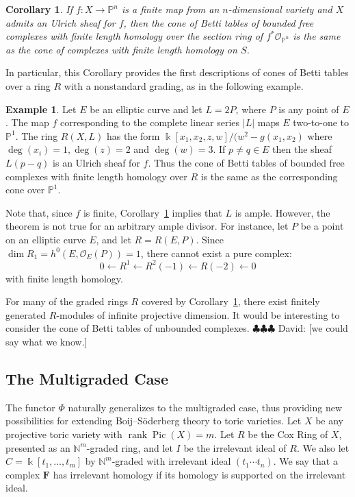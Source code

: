 \documentclass[12pt]{amsart}
\newtheorem{cor}[lemma]{Corollary}
\theoremstyle{definition}
\newtheorem{example}[lemma]{Example}
\theoremstyle{remark}
\newcommand{\Pic}{\operatorname{Pic}}
\newcommand{\kk}{\Bbbk}
\newcommand{\rank}{\operatorname{rank}}
\newcommand{\cO}{\mathcal{O}}
\newcommand{\FF}{\mathbf{F}}
\newcommand{\defi}[1]{\textsf{#1}} %
\newcommand{\david}[1]{{\color{red} \sf $\clubsuit\clubsuit\clubsuit$ David: [#1]}}
\renewcommand{\P}{{\mathbb P}}
\begin{document}

\begin{cor}\label{cor:isom cones}
If $f:X\to \P^{n}$ is a  finite map from an $n$-dimensional variety and $X$ admits an Ulrich sheaf for $f$, then the cone of Betti tables
of bounded free complexes with finite length homology over  the section ring
of $f^{*}\cO_{\P^{n}}$ is the same
as the cone of complexes with finite length homology  on $S$. 
\end{cor}

 In particular, this Corollary provides the first descriptions of cones of Betti tables over a ring $R$ with a nonstandard grading, as in the following example.

\begin{example}\label{ex:elliptic}
Let $E$ be an elliptic curve and let $L=2P$, where $P$ is any point of $E$.  The map $f$ corresponding to the complete
linear series $|L|$ maps $E$ two-to-one to $\P^{1}$. The ring $R(X,L)$ has the form
$\kk[x_1,x_2,z,w]/(w^{2}-g(x_{1},x_{2})$  where $\deg(x_i)=1, \deg(z)=2$ and $\deg(w)=3$. 
If $p\neq q\in E$ then the sheaf $L(p-q)$ is an Ulrich sheaf for $f$. Thus the cone of
Betti tables of bounded free complexes with finite length homology over $R$ is the same
as the corresponding cone over $\P^{1}$.
\end{example}

Note that, since $f$ is finite, Corollary~\ref{cor:isom cones} implies that $L$ is ample.  However, the theorem is not true for an arbitrary ample divisor.  For instance, let $P$ be a point on an elliptic curve $E$, and let $R=R(E,P)$.  Since $\dim R_1=h^0(E,\cO_E(P))=1$, there cannot exist a pure complex:
\[
0\gets R^1\gets R^2(-1)\gets R(-2)\gets 0
\]
with finite length homology.

For many of the graded rings $R$ covered by Corollary~\ref{cor:isom cones}, there exist finitely generated $R$-modules of infinite projective dimension.  It would  be interesting to consider the cone of Betti tables of unbounded complexes. \david{we could say what we know.}

\subsection*{The Multigraded Case}
The functor $\Phi$ naturally generalizes to the multigraded case, thus providing new possibilities for extending Boij--S\"oderberg theory to toric varieties.  Let $X$ be any projective toric variety with $\rank \Pic(X)=m$.  Let $R$ be the Cox Ring of $X$, presented as an $\mathbb N^m$-graded ring, and let $I$ be the irrelevant ideal of $R$.  We also let $C=\kk[t_1, \dots, t_m]$ by $\mathbb N^m$-graded with irrelevant ideal $(t_1\cdots t_n)$.  We say that a complex $\FF$ has \defi{irrelevant homology} if its homology is supported on the irrelevant ideal.
\end{document}
